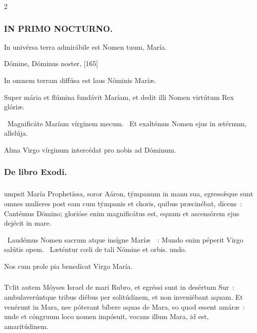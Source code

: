 \documentclass[9pt,twoside]{extarticle}
\begin{document}
\begin{multicols}{2}
{\subsubsection*{\center \textsc{IN PRIMO NOCTURNO.}}
\begin{tightlist}{}
\item {} In univérsa terra admirábile est Nomen tuum, María.
\item {} Dómine, Dóminus noster,  [165]
\item {} In omnem terram diffúsa est laus Nóminis Maríæ.
\item {} Super mária et flúmina fundávit Maríam, et dedit illi Nomen virtútum Rex glóriæ.
\item {}~Magnificáte Maríam vírginem mecum. ~Et exaltémus Nomen ejus in ætérnum, allelúja.
\item {\small {} Alma Virgo vírginum intercédat pro nobis ad Dóminum.}
\end{tightlist}

\subsubsection*{\center De libro Exodi.}
\subsubsection*{\center {}}
umpsit María Prophetíssa, soror Aáron, týmpanum in manu sua, egressǽque sunt omnes mulíeres post eam cum týmpanis et choris, quibus præcinébat, dicens~: Cantémus Dómino; glorióse enim magnificátus est, equum et ascensórem ejus dejécit in mare.

\begin{tightlist}{}
\item {}~Laudémus Nomen sacrum atque insígne Maríæ~~: \textred{*} Mundo enim péperit Virgo salútis opem. ~Læténtur cœli de tali Nómine et orbis. undo.
\item {\small {} Nos cum prole pia benedícat Virgo María.}
\end{tightlist}

\subsubsection*{\center {}}
\lettrine{T}ulit autem Móyses Israel de mari Rubro, et egréssi sunt in desértum Sur~: ambulaverúntque tribus diébus per solitúdinem, et non inveniébant aquam. Et venérunt in Mara, nec póterant bíbere aquas de Mara, eo quod essent amáræ~: unde et cóngruum loco nomen impósuit, vocans illum Mara, id est, amaritúdinem.

}
\end{multicols}
\end{document}
